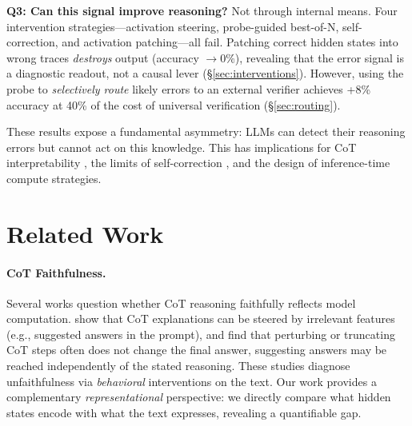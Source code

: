 \documentclass[11pt]{article}
\begin{document}
\vspace{2pt}
\noindent\textbf{Q3: Can this signal improve reasoning?}
Not through internal means. Four intervention strategies---activation steering, probe-guided best-of-N, self-correction, and activation patching---all fail.
Patching correct hidden states into wrong traces \textit{destroys} output (accuracy $\to 0\%$), revealing that the error signal is a diagnostic readout, not a causal lever (\S\ref{sec:interventions}).
However, using the probe to \textit{selectively route} likely errors to an external verifier achieves +8\% accuracy at 40\% of the cost of universal verification (\S\ref{sec:routing}).

\vspace{4pt}
These results expose a fundamental asymmetry: LLMs can detect their reasoning errors but cannot act on this knowledge.
This has implications for CoT interpretability \cite{turpin2024language}, the limits of self-correction \cite{huang2024large}, and the design of inference-time compute strategies.

\section{Related Work}
\label{sec:related}

\paragraph{CoT Faithfulness.}
Several works question whether CoT reasoning faithfully reflects model computation.
\citet{turpin2024language} show that CoT explanations can be steered by irrelevant features (e.g., suggested answers in the prompt), and \citet{lanham2023measuring} find that perturbing or truncating CoT steps often does not change the final answer, suggesting answers may be reached independently of the stated reasoning.
These studies diagnose unfaithfulness via \textit{behavioral} interventions on the text.
Our work provides a complementary \textit{representational} perspective: we directly compare what hidden states encode with what the text expresses, revealing a quantifiable gap.
\end{document}
